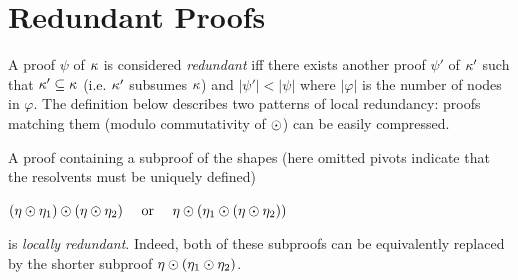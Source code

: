 \documentclass[envcountsame]{llncs}
\begin{document}
\section{Redundant Proofs}

A proof $\psi$ of $\kappa$ is considered \emph{redundant} iff there exists another
proof $\psi'$ of $\kappa'$ such that $\kappa' \subseteq \kappa$ (i.e. $\kappa'$ subsumes $\kappa$)
and $|\psi'| < |\psi|$ where $|\varphi|$ is the number of nodes in $\varphi$.
The definition below describes two patterns of local redundancy: proofs matching them
 (modulo commutativity of $\odot$) can be easily compressed.

\begin{definition}\label{def:localredundancy}
  A proof containing a subproof of the shapes (here omitted pivots indicate that the resolvents must be uniquely defined)

  \smallskip
  \centerline{\(
    (\eta \odot \eta_1) \odot (\eta \odot \eta_2)
    \ \quad\text{or}\quad \
    \eta \odot (\eta_1 \odot (\eta \odot \eta_2))
  \)}

  \smallskip\noindent%
  is \emph{locally redundant}.
  Indeed, both of these subproofs can be equivalently replaced by the
  shorter subproof $\eta \odot (\eta_1 \odot \eta_2)$.
%
\hfill\QED
\end{definition}
\end{document}
